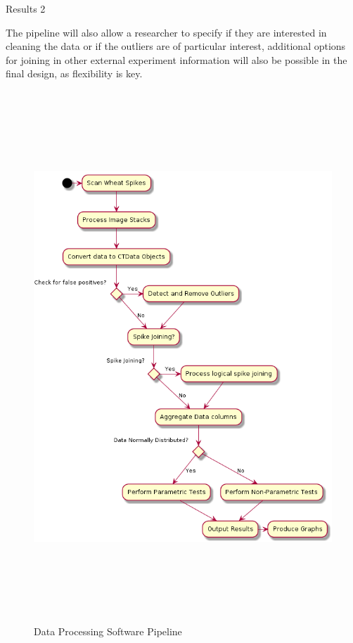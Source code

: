 \documentclass[final]{beamer}
\begin{document}
\begin{frame}{}
\begin{textblock}{28}
\begin{block}{Results 2}
\begin{multicols}{2}
      \vspace{0.5cm}

      The pipeline will also allow a researcher to specify if they are interested in cleaning the data
      or if the outliers are of particular interest, additional options for joining in other external
      experiment information will also be possible in the final design, as flexibility is key.

        \columnbreak

        \begin{figure}[htb]
          \centering
          \includegraphics[width=13.5cm, height=20cm]{flow.png}
          \caption{\label{fig:flow} Data Processing Software Pipeline }
        \end{figure}


\end{multicols}
\end{block}
\end{textblock}
\end{frame}
\end{document}
